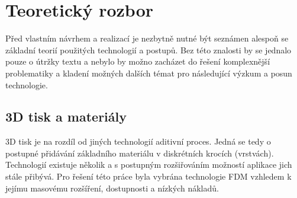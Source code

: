 \chapter{Teoretický rozbor}
Před vlastním návrhem a realizací je nezbytně nutné být seznámen alespoň se základní teorií použitých technologií a postupů. Bez této znalosti by se jednalo pouze o útržky textu a nebylo by možno zacházet do řešení komplexnější problematiky a kladení možných dalších témat pro následující výzkum a posun technologie.

\section{3D tisk a materiály}
3D tisk je na rozdíl od jiných technologií aditivní proces. Jedná se tedy o postupné přidávání základního materiálu v diskrétních krocích (vrstvách).
Technologií existuje několik a s postupným rozšiřováním možností aplikace jich stále přibývá. Pro řešení této práce byla vybrána technologie FDM vzhledem k jejímu masovému rozšíření, dostupnosti a nízkých nákladů. 

